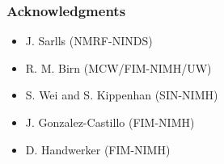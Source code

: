 \documentclass{beamer}
\begin{document}
\begin {frame}

\frametitle {Acknowledgments}

    \vspace{-25mm}

    \begin {itemize}

        \item J. Sarlls (NMRF-NINDS)

        \item R. M. Birn (MCW/FIM-NIMH/UW)

        \item S. Wei and S. Kippenhan (SIN-NIMH)

        \item J. Gonzalez-Castillo (FIM-NIMH)

        \item D. Handwerker (FIM-NIMH)

    \end {itemize}

\end {frame}
\end{document}
